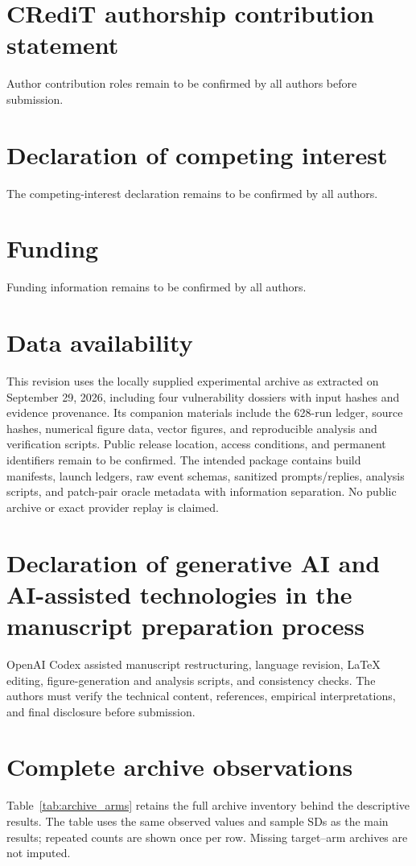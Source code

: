 \documentclass[final,5p,times,number]{elsarticle}
\begin{document}
\section*{CRediT authorship contribution statement}
Author contribution roles remain to be confirmed by all authors before submission.
\section*{Declaration of competing interest}
The competing-interest declaration remains to be confirmed by all authors.
\section*{Funding}
Funding information remains to be confirmed by all authors.
\section*{Data availability}
This revision uses the locally supplied experimental archive as extracted on September 29, 2026, including four vulnerability dossiers with input hashes and evidence provenance. Its companion materials include the 628-run ledger, source hashes, numerical figure data, vector figures, and reproducible analysis and verification scripts. Public release location, access conditions, and permanent identifiers remain to be confirmed. The intended package contains build manifests, launch ledgers, raw event schemas, sanitized prompts/replies, analysis scripts, and patch-pair oracle metadata with information separation. No public archive or exact provider replay is claimed.
\section*{Declaration of generative AI and AI-assisted technologies in the manuscript preparation process}
OpenAI Codex assisted manuscript restructuring, language revision, LaTeX editing, figure-generation and analysis scripts, and consistency checks. The authors must verify the technical content, references, empirical interpretations, and final disclosure before submission.

\appendix
\setcounter{table}{0}
\renewcommand{\theHtable}{appendix.\Alph{section}.\arabic{table}}
\section{Complete archive observations}
\label{sec:archive_appendix}
Table~\ref{tab:archive_arms} retains the full archive inventory behind the descriptive results. The table uses the same observed values and sample SDs as the main results; repeated counts are shown once per row. Missing target--arm archives are not imputed.




\end{document}
